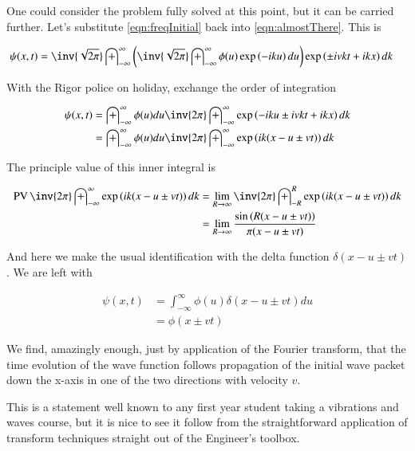 \documentclass{article}
\DeclareMathOperator{\PV}{PV}
\newcommand{\IIinf}[0]{ \int_{-\infty}^\infty }
\begin{document}
One could consider the problem fully solved at this point, but it can be carried further.  Let's substitute 
\ref{eqn:freqInitial} back into \ref{eqn:almostThere}.  This is

\begin{align*}
{\psi}(x,t) &= \inv{\sqrt{2\pi}} \IIinf \left( \inv{\sqrt{2\pi}} \IIinf \phi(u) \exp\left( -i k u \right) du \right) \exp\left( \pm i v k t + i k x \right) dk
\end{align*}

With the Rigor police on holiday, exchange the order of integration

\begin{align*}
{\psi}(x,t) 
&= \IIinf \phi(u) du \inv{{2\pi}} \IIinf \exp\left( -i k u \pm i v k t + i k x \right) dk \\
&= \IIinf \phi(u) du \inv{{2\pi}} \IIinf \exp\left( i k (x - u \pm v t ) \right) dk \\
\end{align*}

The principle value of this inner integral is

\begin{align*}
\PV \inv{{2\pi}} \IIinf \exp\left( i k (x - u \pm v t ) \right) dk 
&= \lim_{R\rightarrow \infty} \inv{2\pi} \int_{-R}^R \exp\left( i k (x - u \pm v t ) \right) dk  \\
&= \lim_{R\rightarrow \infty} \frac{\sin\left( R (x - u \pm v t ) \right) }{ \pi (x - u \pm v t) } \\
\end{align*}

And here we make the usual identification with the delta function $\delta( x - u \pm v t )$.  We are left with

\begin{align*}
{\psi}(x,t) 
&= \IIinf \phi(u) \delta( x - u \pm v t ) du \\
&= \phi( x \pm v t )
\end{align*}

We find, amazingly enough, just by application of the Fourier transform, that the time evolution of the
wave function follows propagation of the initial wave packet down the x-axis in one of the two directions with velocity $v$.

This is a statement well known to any first year student taking a vibrations and waves course, but it is nice to see 
it follow from the straightforward application of transform techniques straight out of the Engineer's toolbox.



\end{document}
